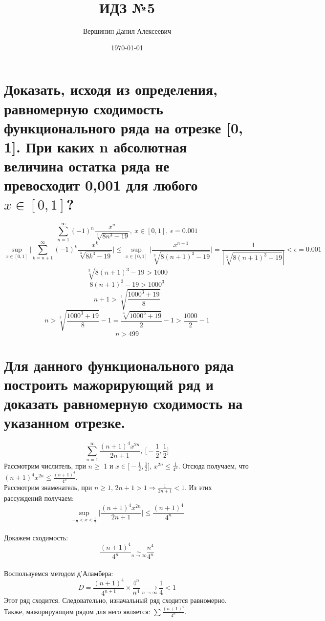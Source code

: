 \documentclass{article}
\title{\vspace{-2cm}ИДЗ №5}
\author{Вершинин Данил Алексеевич}
\date{\today}
\begin{document}
\maketitle





\section{Доказать, исходя из определения, равномерную сходимость функционального ряда на отрезке [0, 1]. При каких n абсолютная величина остатка ряда не превосходит 0,001 для любого $x \in [0, 1]$?}
\[
    \sum\limits_{n=1}^\infty (-1)^n\frac{x^n}{\sqrt[3]{8n^3-19}}, \ x \in [0 , 1], \ \epsilon = 0.001
\]
\[
    \sup\limits_{x \in [0, 1]} \bigg | \sum\limits_{k=n+1}^\infty (-1)^k \frac{x^k}{\sqrt[3]{8k^3-19}} \bigg| \le \sup\limits_{x\in [0, 1]} \bigg| \frac{x^{n+1}}{\sqrt[3]{8(n+1)^3-19}} \bigg| = \frac{1}{|\sqrt[3]{8(n+1)^3-19}|} < \epsilon = 0.001
\]
\[
    \sqrt[3]{8(n+1)^3-19} > 1000
\]
\[
    8(n+1)^3 - 19 > 1000^3
\]
\[
    n+1 > \sqrt[3]{\frac{1000^3 + 19}{8}}
\]
\[
    n > \sqrt[3]{\frac{1000^3 + 19}{8}}-1 = \frac{\sqrt[3]{1000^3 + 19}}{2} - 1 > \frac{1000}{2} - 1
\]
\[
    n > 499\]




\section{Для данного функционального ряда построить мажорирующий ряд и доказать равномерную
сходимость на указанном отрезке.}
\[
    \sum\limits_{n=1}^\infty\frac{(n+1)^4x^{2n}}{2n+1}, \ \bigg[-\frac{1}{2}, \frac{1}{2} \bigg]
\]
Рассмотрим числитель, при  $ n \ge$ 1 и $x \in \bigg[-\frac{1}{2}, \frac{1}{2} \bigg]$, $x^{2n} \le \frac{1}{4^n}$. Отсюда получаем, что $(n+1)^4x^{2n} \le \frac{(n+1)^4}{4^n}$.\\
Рассмотрим знаменатель, при  $n \ge 1 $, $2n+1 > 1 \Rightarrow \frac{1}{2n+1} < 1$.
Из этих рассуждений получаем:\\
\[
    \sup\limits_{-\frac{1}{2} < x < \frac{1}{2}} \bigg| \frac{(n+1)^4x^{2n}}{2n+1} \bigg| \le \frac{(n+1)^4}{4^n}
\]\\
Докажем сходимость:\\
\[
    \frac{(n+1)^4}{4^n} \underset{n \rightarrow \infty}{\sim} \frac{n^4}{4^n}
\]\\
Воспользуемся методом д'Аламбера:\\
\[
    D = \frac{(n+1)^4}{4^{n+1}}\times\frac{4^n}{n^4}\underset{n \rightarrow \infty}{\rightarrow} \frac{1}{4} < 1
\]
Этот ряд сходится. Следовательно, изначальный ряд сходится равномерно.\\
Также, мажорирующим рядом для него является: $\sum\frac{(n+1)^4}{4^n}$.
\end{document}
